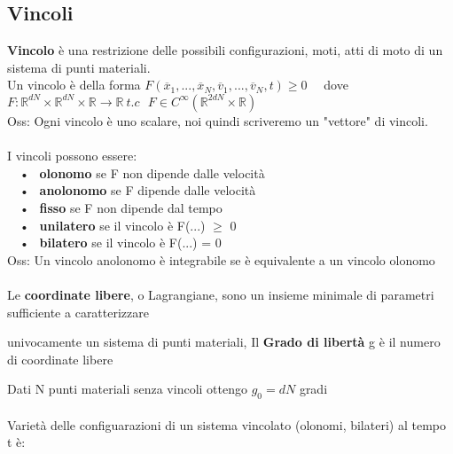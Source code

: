 \documentclass{article}
\begin{document}
\subsection{Vincoli}
%
\textbf{Vincolo} è una restrizione delle possibili configurazioni, moti, atti di moto di un sistema di punti materiali. \\
Un vincolo è della forma $F(\overline{x}_1, ..., \overline{x}_N, \overline{v}_1, ... , \overline{v}_N, t ) \geq 0$ \ \ dove $F:\mathbb{R}^{dN}\times\mathbb{R}^{dN}\times\mathbb{R}\rightarrow\mathbb{R} \ t.c \ \ \ F \in C^\infty(\mathbb{R}^{2dN}\times\mathbb{R})$ \\
Oss: Ogni vincolo è uno scalare, noi quindi scriveremo un "vettore" di vincoli. \\ \\
%
%
%
I vincoli possono essere: \\
\ \ • \ \textbf{olonomo} se F non dipende dalle velocità \\
\ \ • \ \textbf{anolonomo} se F dipende dalle velocità \\
\ \ • \ \textbf{fisso} se F non dipende dal tempo\\
\ \ • \ \textbf{unilatero} se il vincolo è F(...) $\geq$ 0 \\
\ \ • \ \textbf{bilatero} se il vincolo è F(...) = 0 \\
Oss: Un vincolo anolonomo è integrabile se è equivalente a un vincolo olonomo \\ \\
%
%
%
Le \textbf{coordinate libere}, o Lagrangiane, sono un insieme minimale di parametri sufficiente a caratterizzare 

univocamente un sistema di punti materiali, Il \textbf{Grado di libertà} g è il numero di coordinate libere

Dati N punti materiali senza vincoli ottengo $g_0=dN$ gradi \\ \\
%
%
%
Varietà delle configuarazioni di un sistema vincolato (olonomi, bilateri) al tempo t è:
\end{document}

